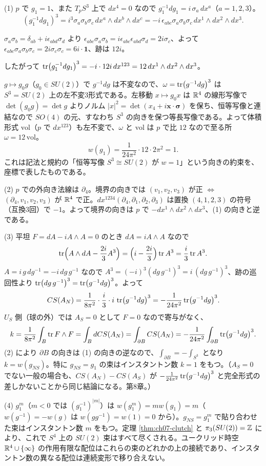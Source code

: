 \begin{solution}
(1) $p$ で $g_1=1$、また $T_pS^3$ 上で $dx^4=0$ なので $g_1^{-1}dg_1=i\,\sigma_a\,dx^a$（$a=1,2,3$）。
\[
(g_1^{-1}dg_1)^3=i^3\sigma_a\sigma_b\sigma_c\,dx^a\wedge dx^b\wedge dx^c=-i\,\epsilon_{abc}\sigma_a\sigma_b\sigma_c\,dx^1\wedge dx^2\wedge dx^3 .
\]
\begin{note}
$\sigma_a\sigma_b=\delta_{ab}+i\epsilon_{abd}\sigma_d$ より $\epsilon_{abc}\sigma_a\sigma_b=i\epsilon_{abc}\epsilon_{abd}\sigma_d=2i\sigma_c$、よって $\epsilon_{abc}\sigma_a\sigma_b\sigma_c=2i\sigma_c\sigma_c=6i\cdot\mathbf 1$、跡は $12i$。
\end{note}
したがって $\tr(g_1^{-1}dg_1)^3=-i\cdot12i\,dx^{123}=12\,dx^1\wedge dx^2\wedge dx^3$。

$g\mapsto g_0g$（$g_0\in SU(2)$）で $g^{-1}dg$ は不変なので、$\omega=\tr(g^{-1}dg)^3$ は $S^3=SU(2)$ 上の左不変3形式である。左移動 $x\mapsto g_0x$ は $\mathbb{R}^4$ の線形写像で $\det(g_0g)=\det g$ よりノルム $\lvert x\rvert^2=\det(x_4+i\bm x\cdot\bm\sigma)$ を保ち、恒等写像と連結なので $SO(4)$ の元、すなわち $S^3$ の向きを保つ等長写像である。よって体積形式 $\mathrm{vol}$（$p$ で $dx^{123}$）も左不変で、$\omega$ と $\mathrm{vol}$ は $p$ で比 $12$ なので至る所 $\omega=12\,\mathrm{vol}$。
\[
w(g_1)=\frac{1}{24\pi^2}\cdot12\cdot2\pi^2=1 .
\]
これは記法と規約の「恒等写像 $S^3\cong SU(2)$ が $w=1$」という向きの約束を、座標で表したものである。

(2) $p$ での外向き法線は $\partial_4$。境界の向きでは $(v_1,v_2,v_3)$ が正 $\iff$ $(\partial_4,v_1,v_2,v_3)$ が $\mathbb{R}^4$ で正。$dx^{1234}(\partial_4,\partial_1,\partial_2,\partial_3)$ は置換 $(4,1,2,3)$ の符号（互換3回）で $-1$。よって境界の向きは $p$ で $-dx^1\wedge dx^2\wedge dx^3$、(1) の向きと逆である。

(3) 平坦 $F=dA-iA\wedge A=0$ のとき $dA=iA\wedge A$ なので
\[
\tr\Bigl(A\wedge dA-\frac{2i}3A^3\Bigr)=\Bigl(i-\frac{2i}3\Bigr)\tr A^3=\frac i3\tr A^3 .
\]
$A=i\,g\,dg^{-1}=-i\,dg\,g^{-1}$ なので $A^3=(-i)^3(dg\,g^{-1})^3=i\,(dg\,g^{-1})^3$、跡の巡回性より $\tr(dg\,g^{-1})^3=\tr(g^{-1}dg)^3$。よって
\[
CS(A_N)=\frac1{8\pi^2}\cdot\frac i3\cdot i\,\tr(g^{-1}dg)^3=-\frac{1}{24\pi^2}\tr(g^{-1}dg)^3 .
\]
$U_S$ 側（球の外）では $A_S=0$ として $F=0$ なので寄与がなく、
\[
k=\frac1{8\pi^2}\int_B\tr F\wedge F=\int_BdCS(A_N)=\int_{\partial B}CS(A_N)=-\frac1{24\pi^2}\int_{\partial B}\tr(g^{-1}dg)^3 .
\]
(2) により $\partial B$ の向きは (1) の向きの逆なので、$\int_{\partial B}=-\int_{S^3}$ となり $k=w(g_{NS})$。特に $g_{NS}=g_1$ の束はインスタントン数 $k=1$ をもつ。（$A_S=0$ でない一般の場合も、$CS(A_N)-CS(A_S)$ が $-\frac1{24\pi^2}\tr(g^{-1}dg)^3$ と完全形式の差しかないことから同じ結論になる。第8章。）

(4) $g_1^m$（$m<0$ では $(g_1^{-1})^{\lvert m\rvert}$）は $w(g_1^m)=mw(g_1)=m$（$w(g^{-1})=-w(g)$ は $w(gg^{-1})=w(1)=0$ から）。$g_{NS}=g_1^m$ で貼り合わせた束はインスタントン数 $m$ をもつ。定理 \ref{thm:ch07-clutch} と $\pi_3(SU(2))=\mathbb{Z}$ により、これで $S^4$ 上の $SU(2)$ 束はすべて尽くされる。ユークリッド時空 $\mathbb{R}^4\cup\{\infty\}$ の作用有限な配位はこれらの束のどれかの上の接続であり、インスタントン数の異なる配位は連続変形で移り合えない。
\end{solution}

